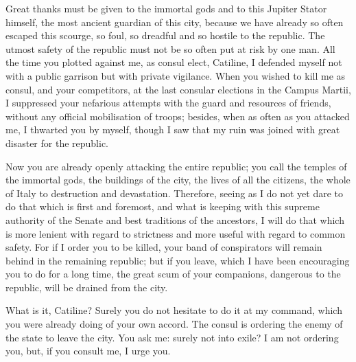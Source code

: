 {  Great thanks must be given to the immortal gods and to this Jupiter Stator himself, the most ancient guardian of this city, because we have already so often escaped this scourge, so foul, so dreadful and so hostile to the republic. The utmost safety of the republic must not be so often put at risk by one man. All the time you plotted against me, as consul elect, Catiline, I defended myself not with a public garrison but with private vigilance. When you wished to kill me as consul, and your competitors, at the last consular elections in the Campus Martii, I suppressed your nefarious attempts with the guard and resources of friends, without any official mobilisation of troops; besides, when as often as you attacked me, I thwarted you by myself, though I saw that my ruin was joined with great disaster for the republic.

  Now you are already openly attacking the entire republic; you call the temples of the immortal gods, the buildings of the city, the lives of all the citizens, the whole of Italy to destruction and devastation. Therefore, seeing as I do not yet dare to do that which is first and foremost, and what is keeping with this supreme authority of the Senate and best traditions of the ancestors, I will do that which is more lenient with regard to strictness and more useful with regard to common safety. For if I order you to be killed, your band of conspirators will remain behind in the remaining republic; but if you leave, which I have been encouraging you to do for a long time, the great scum of your companions, dangerous to the republic, will be drained from the city.

  What is it, Catiline? Surely you do not hesitate to do it at my command, which you were already doing of your own accord. The consul is ordering the enemy of the state to leave the city. You ask me: surely not into exile? I am not ordering you, but, if you consult me, I urge you.
}
